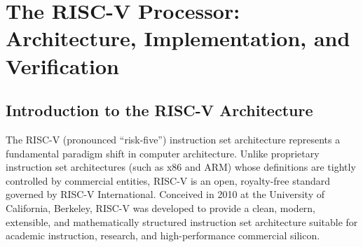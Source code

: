
\chapter{The RISC-V Processor: Architecture, Implementation, and Verification}\label{riscvProcessor}
\localtoc

\section{Introduction to the RISC-V Architecture}\label{riscvIntro}

The RISC-V (pronounced ``risk-five'') instruction set architecture represents a fundamental paradigm shift in computer architecture. Unlike proprietary instruction set architectures (such as x86 and ARM) whose definitions are tightly controlled by commercial entities, RISC-V is an open, royalty-free standard governed by RISC-V International. Conceived in 2010 at the University of California, Berkeley, RISC-V was developed to provide a clean, modern, extensible, and mathematically structured instruction set architecture suitable for academic instruction, research, and high-performance commercial silicon.

